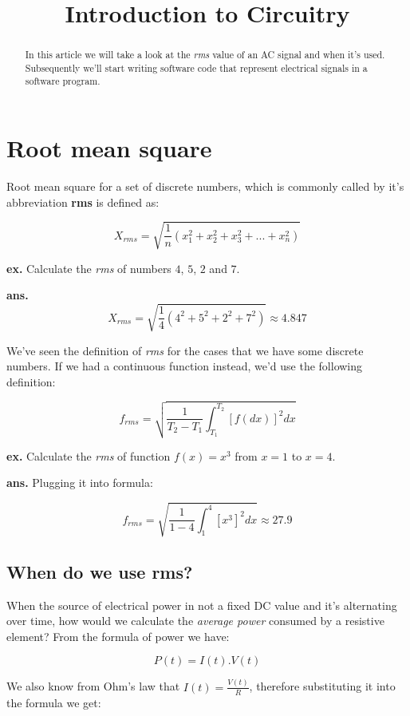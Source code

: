 \documentclass{article}
\begin{document}
	
	\title{Introduction to Circuitry}
	\author{}
	
	\maketitle
	
	\begin{abstract}
	In this article we will take a look at the \textit{rms} value of an AC signal and when it's used.
	Subsequently we'll start writing software code that represent electrical signals in a software program.

	\end{abstract}
	
	\section{Root mean square}
	Root mean square for a set of discrete numbers, which is commonly called by it's abbreviation \textbf{rms} is defined as:
	
	$$ X_{rms} = \sqrt{\frac{1}{n}(x_1^2 + x_2^2 + x_3^2 + ... + x_n^2 )} $$

	\textbf{ex.} Calculate the \textit{rms} of numbers $4$, $5$, $2$ and $7$.
	
	\textbf{ans.} $$ X_{rms} = \sqrt{\frac{1}{4}(4^2 + 5^2 + 2^2 + 7^2)} \approx 4.847 $$
	
	We've seen the definition of \textit{rms} for the cases that we have some discrete numbers.
	If we had a continuous function instead, we'd use the following definition:
	
	$$ f_{rms} = \sqrt{\frac{1}{T_2 - T_1} \int_{T_1}^{T_2} [f(dx)]^2 dx } $$
	
	\textbf{ex.} Calculate the \textit{rms} of function $f(x) = x^3$ from $x = 1$ to $x = 4$.
	
	\textbf{ans.} Plugging it into formula:
	
	$$ f_{rms} = \sqrt{\frac{1}{1 - 4} \int_{1}^{4} [x^3]^2 dx } \approx 27.9 $$

	\subsection{When do we use rms?}
	When the source of electrical power in not a fixed DC value and it's alternating over time, how would we calculate the \textit{average power} consumed by a resistive element? From the formula of power we have:
	
	$$P(t) = I(t).V(t)$$

	We also know from Ohm's law that $I(t) = \frac{V(t)}{R}$, therefore substituting it into the formula we get:
	
\end{document}
